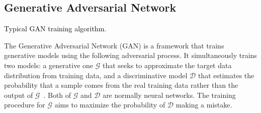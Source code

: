 \documentclass[journal,comsoc,letter]{IEEEtran}
\newcommand{\rev}[1]{\textcolor{black}{#1}}
\begin{document}
\subsection{Generative Adversarial Network}
\begin{algorithm}[t]
  \caption{\rev{Typical GAN training algorithm. \label{alg:gan}}}
  \label{tra_gan}
  \begin{algorithmic}[1]
  \color{black}
    \label{ln:bigloop}
     \label{ln:loopd}
        	 \label{ln:sampling1}
        	 \label{ln:sampling1}
               \State{$g_\mathcal{D} \leftarrow \Delta_{\Theta_\mathcal{D}}[\frac{1}{m}\sum_{i=1}^m \log \mathcal{D}(x^{(i)}) +$}\label{ln:grad1}
               \Statex{\hspace*{6em}$+ \frac{1}{m}\sum_{i=1}^m \log (1-\mathcal{D}(\mathcal{G}(z^{(i)})))]$.}               
                \label{ln:adam1}
	\EndFor
           \label{ln:adam2}
    \EndWhile
    \end{algorithmic}
\end{algorithm}
The Generative Adversarial Network (GAN) is a framework that trains generative models using the following adversarial process. It simultaneously trains two models: a generative one $\mathcal{G}$ that seeks to approximate the target data distribution from training data, and a discriminative model $\mathcal{D}$ that estimates the probability that a sample comes from the real training data rather than the output of $\mathcal{G}$~\cite{goodfellow2014generative}.  Both of $\mathcal{G}$ and  $\mathcal{D}$ are normally neural networks. The training procedure for $\mathcal{G}$ aims to maximize the probability of $\mathcal{D}$ making a mistake. 
\end{document}
